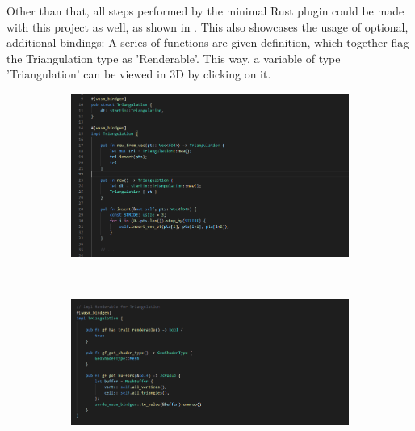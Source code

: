 Other than that, all steps performed by the minimal Rust plugin could be made with this project as well, as shown in . 
This also showcases the usage of optional, additional bindings:
A series of functions are given definition, which together flag the Triangulation type as 'Renderable'. 
This way, a variable of type 'Triangulation' can be viewed in 3D by clicking on it.

\begin{figure}
  \centering
  \begin{subfigure}[b]{0.90\linewidth}
    \graphicspath{{../../assets/images/6.1.2}}
    \centering
    \includegraphics[width=\linewidth]{1.PNG}
  \end{subfigure}%
  \\ 
  \begin{subfigure}[b]{0.90\linewidth}
    \graphicspath{{../../assets/images/6.1.2}}
    \centering
    \includegraphics[width=\linewidth]{5.PNG}
  \end{subfigure}%
  \\
  \begin{subfigure}[b]{0.90\linewidth}
    \graphicspath{{../../assets/images/6.1.2}}
    \centering

\end{subfigure}
\end{figure}
